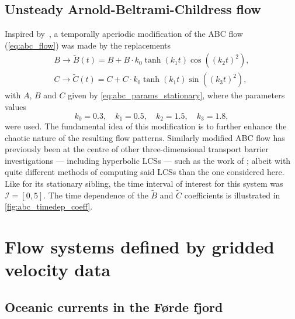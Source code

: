 \subsection{Unsteady Arnold-Beltrami-Childress flow}%
\label{sub:unsteady_arnold_beltrami_childress_flow}

Inspired by~\textcite{oettinger2016autonomous}, a temporally aperiodic
modification of the ABC flow (\cref{eq:abc_flow}) was made by the replacements
\begin{equation}
    \label{eq:abc_params_nonstationary}
    \begin{gathered}
    B\to{}\widetilde{B}(t) = B + B\cdot{}k_{0}\tanh(k_{1}t)\cos({({k_{2}t})}^{2}),\\
    C\to{}\widetilde{C}(t) = C + C\cdot{}k_{0}\tanh(k_{1}t)\sin({({k_{3}t})}^{2}),
    \end{gathered}
\end{equation}
with $A$, $B$ and $C$ given by \cref{eq:abc_params_stationary}, where the
parameters values
\begin{equation}
    \label{eq:abc_params_nonstationary_frequencies}
    k_{0}=0.3,\quad k_{1}=0.5,\quad k_{2}=1.5,\quad k_{3}=1.8,
\end{equation}
were used. The fundamental idea of this modification is to further enhance
the chaotic nature of the resulting flow patterns. Similarly modified
ABC flow has previously been at the centre of other three-dimensional transport
barrier investigations --- including hyperbolic LCSs --- such as the work of
\textcite{blazevski2014hyperbolic}; albeit with quite different methods of
computing said LCSs than the one considered here. Like for its stationary
sibling, the time interval of interest for this system was $\mathcal{I}=[0,5]$.
The time dependence of the $\widetilde{B}$ and  $\widetilde{C}$ coefficients is
illustrated in \cref{fig:abc_timedep_coeff}.



\section{Flow systems defined by gridded velocity data}
\label{sec:flow_systems_defined_by_gridded_velocity_data}

\subsection{Oceanic currents in the Førde fjord}
\label{ssub:oceanic_currents_in_the_forde_fjord}

